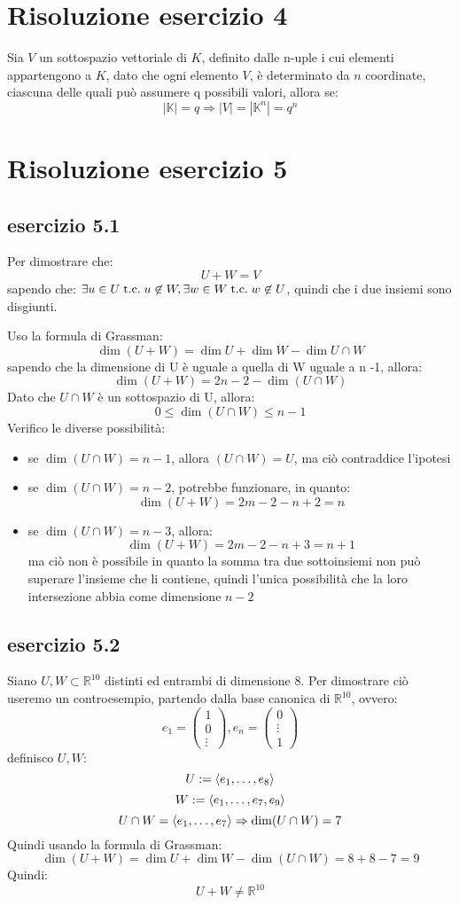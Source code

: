 \documentclass[a4paper,12pt]{article}
\begin{document}
	\section{Risoluzione esercizio 4}
	Sia $V$ un sottospazio vettoriale di $K$, definito dalle n-uple i cui elementi appartengono a $K$, dato che ogni elemento $V$, è determinato da $n$ coordinate, ciascuna delle quali può assumere q possibili valori, allora se:
	\[|\mathbb{K}| = q \Rightarrow |V| = |\mathbb{K}^n| = q^n\]
	\section{Risoluzione esercizio 5}
	\subsection{esercizio 5.1}
	Per dimostrare che:
	\[U + W = V\]
	sapendo che: $\exists u \in U \;\text{t.c.}\; u \not \in W, \exists w \in W \;\text{t.c.}\; w \not \in U$, quindi che i due insiemi sono disgiunti.
	
	Uso la formula di Grassman:
	\[\dim (U + W) = \dim U + \dim W - \dim U \cap W\]
	sapendo che la dimensione di U è uguale a quella di W uguale a n -1, allora:
	\[\dim (U + W) = 2n - 2 - \dim (U \cap W)\]
	Dato che $U \cap W$ è un sottospazio di U, allora:
	\[0 \leq \dim(U \cap W) \leq n - 1\]
	Verifico le diverse possibilità:
	\begin{itemize}
		\item se $\dim(U \cap W) = n -1$, allora $(U \cap W) = U$, ma ciò contraddice l'ipotesi
		\item se $\dim(U \cap W) = n -2$, potrebbe funzionare, in quanto:
		\[\dim (U + W) = 2m - 2 - n + 2 = n\]
		\item se $\dim(U \cap W) = n - 3$, allora:
		\[\dim (U + W) = 2m - 2 - n + 3 = n + 1\]
		ma ciò non è possibile in quanto la somma tra due sottoinsiemi non può superare l'insieme che li contiene, quindi l'unica possibilità che la loro intersezione abbia come dimensione $n - 2$
	\end{itemize}
	
	\subsection{esercizio 5.2}
	Siano $U,W \subset \mathbb{R}^{10}$ distinti ed entrambi di dimensione 8.
	Per dimostrare ciò useremo un controesempio, partendo dalla base canonica di $\mathbb{R}^{10}$, ovvero:
	\[e_1 = \begin{pmatrix} 1 \\ 0 \\ \vdots \end{pmatrix}, e_n = \begin{pmatrix} 0 \\ \vdots \\ 1 \end{pmatrix}\]
	definisco $U, W$:
	\[U := \langle e_1, \dots, e_8 \rangle\]
	\[W := \langle e_1, \dots, e_7, e_9 \rangle\]
	\[U \cap W = \langle e_1, \dots, e_7 \rangle \Rightarrow \dim (U \cap W) = 7\]
	Quindi usando la formula di Grassman: 
	\[\dim (U + W) = \dim U + \dim W - \dim (U \cap W ) = 8 + 8 - 7 = 9\]
	Quindi:
	\[U + W \not = \mathbb{R}^{10}\]
\end{document}
